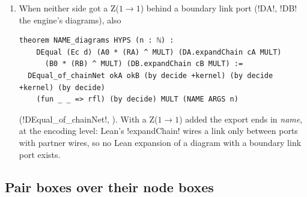 {\begin{algorithm}
\begin{enumerate}
  \code!maxRecDepth 100000! and \code!maxHeartbeats 2000000!, each piece's source as namespace
  \textit{tag} (\py!_piece_source!: import, header and diagram restatement dropped, macros kept for
  the first piece only), the literals \code!DA!, \code!cA!, \code!DB!, \code!cB!,
  \code!def W : ℕ!, the environment \code!Ec d! (dimension $d$, phases zero, no labels),
  \code!hDc!, \code!okA!/\code!okB : ChainFamOK! (15 \code!decide +kernel! proofs),
  \code!fA!/\code!fB : famOK ... = true!, the moved pieces \code!sA!, \code!sB!, \code!s0!
  (each \code!(tag.main args).env0 (E' := Ec d)!, then \lean!Equal.mapL2! with the relabelings
  and \lean!ren_injective!, then \lean!reorderL!/\lean!reorder! onto the Lean pieces), and
\begin{lstlisting}[style=grammar]
theorem family HYPS (k : ℕ) :
    Equal (Ec d) (A0 * (RA) ^ k) ((DA.expandChain cA k).toNet M)
      (B0 * (RB) ^ k) ((DB.expandChain cB k).toNet M) :=
  chain_pair okA okB (by decide) (by decide) (Ec d) (hDc d) M (by decide) fA fB
    (sA ARGS) (sB ARGS) (s0 ARGS) k
theorem NAME HYPS (n : ℕ) : ...at the multiplicity... := family ARGS MULT
\end{lstlisting}
  with the multiplicity as a Lean natural in its symbol (\py!_mult_nat!).
\item When neither side got a Z($1\to1$) behind a boundary link port (\code!DA!, \code!DB! the
  engine's diagrams), also
\begin{lstlisting}[style=grammar]
theorem NAME_diagrams HYPS (n : ℕ) :
    DEqual (Ec d) (A0 * (RA) ^ MULT) (DA.expandChain cA MULT)
      (B0 * (RB) ^ MULT) (DB.expandChain cB MULT) :=
  DEqual_of_chainNet okA okB (by decide +kernel) (by decide +kernel) (by decide)
    (fun _ _ => rfl) (by decide) MULT (NAME ARGS n)
\end{lstlisting}
  (\lean!DEqual_of_chainNet!, ). With a Z($1\to1$) added the
  export ends in \textit{name}, at the encoding level: Lean's \lean!expandChain! wires a link
  only between ports with partner wires, so no Lean expansion of a diagram with a boundary link
  port exists.
\end{enumerate}
\end{algorithm}

\subsection{Pair boxes over their node boxes}\label{sec:lean-export-net-pairs}

}
